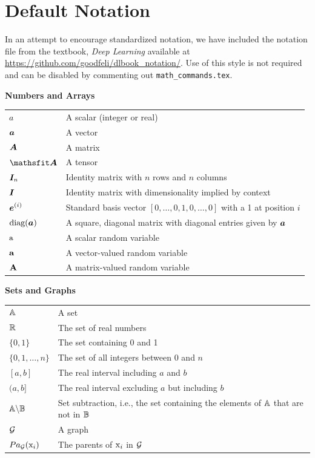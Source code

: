 \documentclass{article} %
\begin{document}
\section{Default Notation}

In an attempt to encourage standardized notation, we have included the
notation file from the textbook, \textit{Deep Learning}
\cite{goodfellow2016deep} available at
\url{https://github.com/goodfeli/dlbook_notation/}.  Use of this style
is not required and can be disabled by commenting out
\texttt{math\_commands.tex}.


\centerline{\bf Numbers and Arrays}
\bgroup
\def\arraystretch{1.5}
\begin{tabular}{p{1in}p{3.25in}}
$\displaystyle a$ & A scalar (integer or real)\\
$\displaystyle {\bm{a}}$ & A vector\\
$\displaystyle {\bm{A}}$ & A matrix\\
$\displaystyle \tA$ & A tensor\\
$\displaystyle {\bm{I}}_n$ & Identity matrix with $n$ rows and $n$ columns\\
$\displaystyle {\bm{I}}$ & Identity matrix with dimensionality implied by context\\
$\displaystyle {\bm{e}}^{(i)}$ & Standard basis vector $[0,\dots,0,1,0,\dots,0]$ with a 1 at position $i$\\
$\displaystyle \text{diag}({\bm{a}})$ & A square, diagonal matrix with diagonal entries given by ${\bm{a}}$\\
$\displaystyle {\textnormal{a}}$ & A scalar random variable\\
$\displaystyle {\mathbf{a}}$ & A vector-valued random variable\\
$\displaystyle {\mathbf{A}}$ & A matrix-valued random variable\\
\end{tabular}
\egroup
\vspace{0.25cm}

\centerline{\bf Sets and Graphs}
\bgroup
\def\arraystretch{1.5}

\begin{tabular}{p{1.25in}p{3.25in}}
$\displaystyle {\mathbb{A}}$ & A set\\
$\displaystyle \mathbb{R}$ & The set of real numbers \\
$\displaystyle \{0, 1\}$ & The set containing 0 and 1 \\
$\displaystyle \{0, 1, \dots, n \}$ & The set of all integers between $0$ and $n$\\
$\displaystyle [a, b]$ & The real interval including $a$ and $b$\\
$\displaystyle (a, b]$ & The real interval excluding $a$ but including $b$\\
$\displaystyle {\mathbb{A}} \backslash {\mathbb{B}}$ & Set subtraction, i.e., the set containing the elements of ${\mathbb{A}}$ that are not in ${\mathbb{B}}$\\
$\displaystyle {\mathcal{G}}$ & A graph\\
$\displaystyle Pa_{\mathcal{G}}({\textnormal{x}}_i)$ & The parents of ${\textnormal{x}}_i$ in ${\mathcal{G}}$
\end{tabular}
\vspace{0.25cm}
\end{document}
